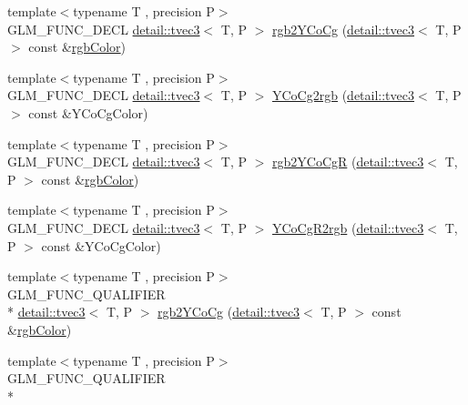 \begin{DoxyCompactItemize}
\item 
{\footnotesize template$<$typename T , precision P$>$ }\\G\-L\-M\-\_\-\-F\-U\-N\-C\-\_\-\-D\-E\-C\-L \hyperlink{structglm_1_1detail_1_1tvec3}{detail\-::tvec3}$<$ T, P $>$ \hyperlink{group__gtx__color__space___y_co_cg_ga2a235b86e67866fd9fef640bcc47c93d}{rgb2\-Y\-Co\-Cg} (\hyperlink{structglm_1_1detail_1_1tvec3}{detail\-::tvec3}$<$ T, P $>$ const \&\hyperlink{group__gtx__color__space_gafe29cc37c2675aee66c9f9ae3e5e7294}{rgb\-Color})
\item 
{\footnotesize template$<$typename T , precision P$>$ }\\G\-L\-M\-\_\-\-F\-U\-N\-C\-\_\-\-D\-E\-C\-L \hyperlink{structglm_1_1detail_1_1tvec3}{detail\-::tvec3}$<$ T, P $>$ \hyperlink{group__gtx__color__space___y_co_cg_gab40e31e352d2d318d3f062df2882c500}{Y\-Co\-Cg2rgb} (\hyperlink{structglm_1_1detail_1_1tvec3}{detail\-::tvec3}$<$ T, P $>$ const \&Y\-Co\-Cg\-Color)
\item 
{\footnotesize template$<$typename T , precision P$>$ }\\G\-L\-M\-\_\-\-F\-U\-N\-C\-\_\-\-D\-E\-C\-L \hyperlink{structglm_1_1detail_1_1tvec3}{detail\-::tvec3}$<$ T, P $>$ \hyperlink{group__gtx__color__space___y_co_cg_gaeee43c2a06fe63d46a96cee4d1c63ce6}{rgb2\-Y\-Co\-Cg\-R} (\hyperlink{structglm_1_1detail_1_1tvec3}{detail\-::tvec3}$<$ T, P $>$ const \&\hyperlink{group__gtx__color__space_gafe29cc37c2675aee66c9f9ae3e5e7294}{rgb\-Color})
\item 
{\footnotesize template$<$typename T , precision P$>$ }\\G\-L\-M\-\_\-\-F\-U\-N\-C\-\_\-\-D\-E\-C\-L \hyperlink{structglm_1_1detail_1_1tvec3}{detail\-::tvec3}$<$ T, P $>$ \hyperlink{group__gtx__color__space___y_co_cg_ga7b90b9b5758dbe96a82a2ef8237a17e9}{Y\-Co\-Cg\-R2rgb} (\hyperlink{structglm_1_1detail_1_1tvec3}{detail\-::tvec3}$<$ T, P $>$ const \&Y\-Co\-Cg\-Color)
\item 
{\footnotesize template$<$typename T , precision P$>$ }\\G\-L\-M\-\_\-\-F\-U\-N\-C\-\_\-\-Q\-U\-A\-L\-I\-F\-I\-E\-R \\*
\hyperlink{structglm_1_1detail_1_1tvec3}{detail\-::tvec3}$<$ T, P $>$ \hyperlink{group__gtx__color__space___y_co_cg_ga2a235b86e67866fd9fef640bcc47c93d}{rgb2\-Y\-Co\-Cg} (\hyperlink{structglm_1_1detail_1_1tvec3}{detail\-::tvec3}$<$ T, P $>$ const \&\hyperlink{group__gtx__color__space_gafe29cc37c2675aee66c9f9ae3e5e7294}{rgb\-Color})
\item 
{\footnotesize template$<$typename T , precision P$>$ }\\G\-L\-M\-\_\-\-F\-U\-N\-C\-\_\-\-Q\-U\-A\-L\-I\-F\-I\-E\-R \\*

\end{DoxyCompactItemize}
